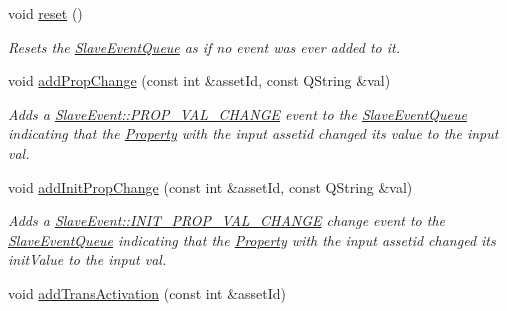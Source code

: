 \begin{DoxyCompactItemize}
\item 
\hypertarget{class_picto_1_1_slave_event_queue_a6d8c7af8805b185f08a9f2d12f950ff1}{void \hyperlink{class_picto_1_1_slave_event_queue_a6d8c7af8805b185f08a9f2d12f950ff1}{reset} ()}\label{class_picto_1_1_slave_event_queue_a6d8c7af8805b185f08a9f2d12f950ff1}

\begin{DoxyCompactList}\small\item\em Resets the \hyperlink{class_picto_1_1_slave_event_queue}{Slave\-Event\-Queue} as if no event was ever added to it. \end{DoxyCompactList}\item 
\hypertarget{class_picto_1_1_slave_event_queue_a99158db26e2d137b3d3fc4c2d9593538}{void \hyperlink{class_picto_1_1_slave_event_queue_a99158db26e2d137b3d3fc4c2d9593538}{add\-Prop\-Change} (const int \&asset\-Id, const Q\-String \&val)}\label{class_picto_1_1_slave_event_queue_a99158db26e2d137b3d3fc4c2d9593538}

\begin{DoxyCompactList}\small\item\em Adds a \hyperlink{class_picto_1_1_slave_event_a5e2557edef42f1cfd7ae98463166c4a4afb990fae9e3e7caac8287944c9f3e0a6}{Slave\-Event\-::\-P\-R\-O\-P\-\_\-\-V\-A\-L\-\_\-\-C\-H\-A\-N\-G\-E} event to the \hyperlink{class_picto_1_1_slave_event_queue}{Slave\-Event\-Queue} indicating that the \hyperlink{class_picto_1_1_property}{Property} with the input assetid changed its value to the input val. \end{DoxyCompactList}\item 
\hypertarget{class_picto_1_1_slave_event_queue_a7ed77020ce552990cdf84f8f41283949}{void \hyperlink{class_picto_1_1_slave_event_queue_a7ed77020ce552990cdf84f8f41283949}{add\-Init\-Prop\-Change} (const int \&asset\-Id, const Q\-String \&val)}\label{class_picto_1_1_slave_event_queue_a7ed77020ce552990cdf84f8f41283949}

\begin{DoxyCompactList}\small\item\em Adds a \hyperlink{class_picto_1_1_slave_event_a5e2557edef42f1cfd7ae98463166c4a4a77e5ce75f66238c8a3872a66ec7b7684}{Slave\-Event\-::\-I\-N\-I\-T\-\_\-\-P\-R\-O\-P\-\_\-\-V\-A\-L\-\_\-\-C\-H\-A\-N\-G\-E} change event to the \hyperlink{class_picto_1_1_slave_event_queue}{Slave\-Event\-Queue} indicating that the \hyperlink{class_picto_1_1_property}{Property} with the input assetid changed its init\-Value to the input val. \end{DoxyCompactList}\item 
\hypertarget{class_picto_1_1_slave_event_queue_a1196dac6d07baefc65c52167aa3e93f6}{void \hyperlink{class_picto_1_1_slave_event_queue_a1196dac6d07baefc65c52167aa3e93f6}{add\-Trans\-Activation} (const int \&asset\-Id)}\label{class_picto_1_1_slave_event_queue_a1196dac6d07baefc65c52167aa3e93f6}


\end{DoxyCompactItemize}
